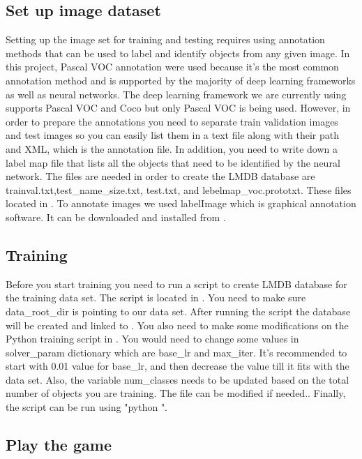\documentclass[onecolumn, draftclsnofoot,10pt, compsoc]{IEEEtran}
\begin{document}
\subsection{Set up image dataset}

Setting up the image set for training and testing requires using annotation methods that can be used to label and identify objects from any given image.
In this project, Pascal VOC annotation were used because it's the most common annotation method and is supported by the majority of deep learning frameworks as well as neural networks.
The deep learning framework we are currently using supports Pascal VOC and Coco but only Pascal VOC is being used.
However, in order to prepare the annotations you need to separate train validation images and test images so you can easily list them in a text file along with their path and XML, which is the annotation file.
In addition, you need to write down a label map file that lists all the objects that need to be identified by the neural network. 
The files are needed in order to create the LMDB database are trainval.txt,test\_name\_size.txt, test.txt, and lebelmap\_voc.prototxt. 
These files located in . 
To annotate images we used labelImage which is graphical annotation software. 
It can be downloaded and installed from .

\subsection{Training}

Before you start training you need to run a script to create LMDB database for the training data set.
The script is located in .
You need to make sure data\_root\_dir is pointing to our data set.
After running the script the database will be created and linked to .
You also need to make some modifications on the Python training script in .
You would need to change some values in solver\_param dictionary which are base\_lr and max\_iter.
It's recommended to start with 0.01 value for base\_lr, and then decrease the value till it fits with the data set.
Also, the variable num\_classes needs to be updated based on the total number of objects you are training.
The file can be modified if needed..
Finally, the script can be run using "python ".

\subsection{Play the game}
\end{document}
